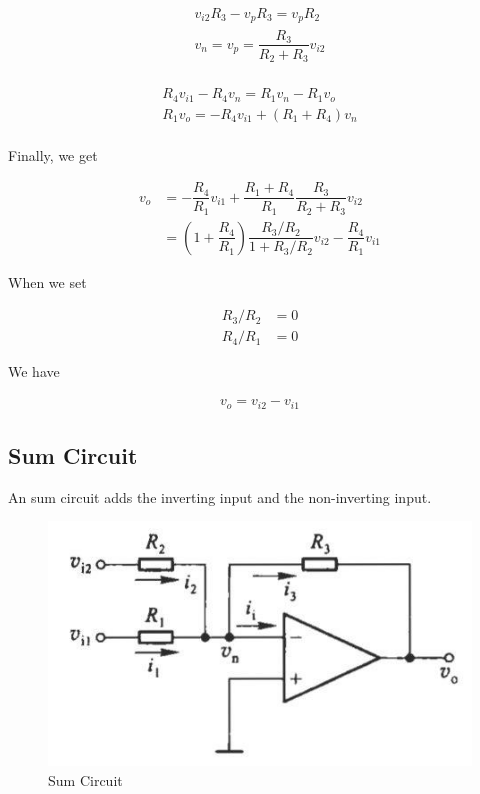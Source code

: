 \begin{equation*}
  \begin{aligned}
    v_{i2} R_3 - v_p R_3 = v_p R_2 \\
    v_n = v_p = \dfrac{R_3}{R_2 + R_3} v_{i2} \\
  \end{aligned}
\end{equation*}

\begin{equation*}
  \begin{aligned}
    R_4 v_{i1} - R_4 v_n = R_1 v_n - R_1 v_o \\
    R_1 v_o = - R_4 v_{i1} + \left( R_1 + R_4 \right) v_n \\
  \end{aligned}
\end{equation*}

Finally, we get

\begin{equation*}
  \begin{aligned}
    v_o &= - \dfrac{R_4}{R_1} v_{i1} + \dfrac{R_1 + R_4}{R_1}  \dfrac{R_3}{R_2 + R_3} v_{i2} \\
        &= \left( 1 + \dfrac{R_4}{R_1} \right) \dfrac{R_3 / R_2 }{1 + R_3 / R_2} v_{i2} - \dfrac{R_4}{R_1} v_{i1}  
  \end{aligned}
\end{equation*}

When we set

\begin{equation*}
  \begin{aligned}
    R_3 / R_2 &= 0 \\
    R_4 / R_1 &= 0
  \end{aligned}
\end{equation*}

We have

\begin{equation*}
  \begin{aligned}
    v_o = v_{i2} - v_{i1}
  \end{aligned}
\end{equation*}

\subsection{Sum Circuit}

An sum circuit adds the inverting input and the non-inverting input.

\begin{figure}[H]
  \centering
  \includegraphics[width=0.4\linewidth]{figures/sum-amplifier}
  \caption{Sum Circuit}
  \label{fig:}
\end{figure}

